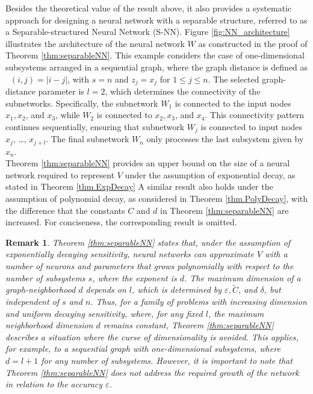 \documentclass{article}
\DeclareMathOperator{\distG}{\operatorname{dist_\mathcal{G}}} %
\newtheorem{remark}{Remark}[section]
\begin{document}
Besides the theoretical value of the result above,  it also provides a systematic approach for designing a neural network with a separable structure, referred to as a Separable-structured Neural Network (S-NN). Figure \ref{fig:NN_architecture} illustrates the architecture of the neural network \( W \) as constructed in the proof of Theorem \ref{thm:separableNN}. 
This example considers the case of one-dimensional subsystems arranged in a sequential graph, where the graph distance is defined as \( \distG(i,j) = |i-j| \), with \( s = n \) and \( z_j = x_j \) for \( 1 \leq j \leq n \). The selected graph-distance parameter is \( l = 2 \), which determines the connectivity of the subnetworks. Specifically, the subnetwork \( W_1 \) is connected to the input nodes \( x_1, x_2 \), and \( x_3 \), while \( W_2 \) is connected to \( x_2, x_3 \), and \( x_4 \). This connectivity pattern continues sequentially, ensuring that subnetwork $W_j$ is connected to input nodes $x_j$, \dots, $x_{j+l}$. The final subnetwork $W_n$ only processes the last subsystem given by $x_n$. \\

Theorem \ref{thm:separableNN} provides an upper bound on the size of a neural network required to represent $V$ under the assumption of exponential decay, as stated in Theorem \ref{thm.ExpDecay} A similar result also holds under the assumption of polynomial decay, as considered in Theorem \ref{thm.PolyDecay}, with the difference that the constants $C$ and $d$ in Theorem \ref{thm:separableNN} are increased. For conciseness, the corresponding result is omitted. 

\begin{remark}
Theorem \ref{thm:separableNN} states that, under the assumption of exponentially decaying sensitivity, neural networks can approximate $V$ with a number of neurons and parameters that grows polynomially with respect to the number of subsystems $s$, where the exponent is $d$. The maximum dimension of a graph-neighborhood $d$ depends on $l$, which is determined by $\varepsilon, \widetilde{C}$, and $\delta$, but independent of $s$ and $n$. Thus, for a family of problems with increasing dimension and uniform decaying sensitivity, where, for any fixed $l$, the maximum neighborhood dimension $d$ remains constant, Theorem \ref{thm:separableNN} describes a situation where the curse of dimensionality is avoided. This applies, for example, to a sequential graph with one-dimensional subsystems, where $d = l + 1$ for any number of subsystems. However, it is important to note that Theorem \ref{thm:separableNN} does not address the required growth of the network in relation to the accuracy \(\varepsilon\).   
\end{remark}
\end{document}
